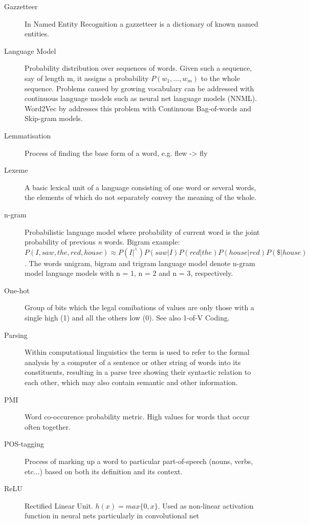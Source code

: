 \documentclass[12pt,a4paper,english
]{tutthesis}
\begin{document}
\begin{description}
\item[Gazzetteer] In Named Entity Recognition a gazzetteer is a dictionary of known named entities.

\item[Language Model] Probability distribution over sequences of words. Given such a sequence, say of length m, it assigns a probability $P(w_{1},\ldots ,w_{m})$ to the whole sequence. Problems caused by growing vocabulary can be addressed with continuous language models such as neural net language models (NNML). Word2Vec by \cite{Mikolov2013} addresses this problem with Continuous Bag-of-words and Skip-gram models.

\item[Lemmatisation] Process of finding the base form of a word, e.g. flew -> fly

\item[Lexeme] A basic lexical unit of a language consisting of one word or several words, the elements of which do not separately convey the meaning of the whole.

\item[n-gram] Probabilistic language model where probability of current word is the joint probability of previous \textit{n} words. Bigram example: $P(I, saw, the, red, house) \approx P(I | ^\wedge)P(saw | I)P(red | the)P(house | red)P(\$ | house)$. The words unigram, bigram and trigram language model denote n-gram model language models with n = 1, n = 2 and n = 3, respectively.

\item[One-hot] Group of bits which the legal comibations of values are only those with a single high (1) and all the others low (0). See also 1-of-V Coding.

\item[Parsing] Within computational linguistics the term is used to refer to the formal analysis by a computer of a sentence or other string of words into its constituents, resulting in a parse tree showing their syntactic relation to each other, which may also contain semantic and other information.

\item[PMI] Word co-occurence probability metric. High values for words that occur often together.

\item[POS-tagging] Process of marking up a word to particular part-of-speech (nouns, verbs, etc...) based on both its definition and its context.

\item[ReLU] Rectified Linear Unit. $h(x) = max\{0, x\}$. Used as non-linear activation function in neural nets particularly in convolutional net


\end{description}
\end{document}
